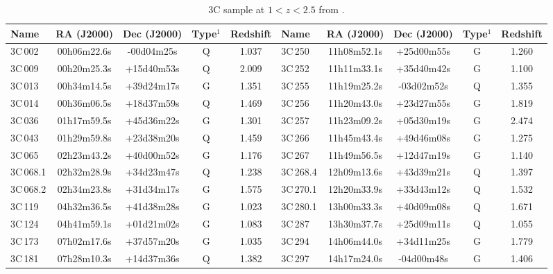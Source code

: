 \documentclass[mathleft,fleqn,%
]{an}
\begin{document}
\begin{table*}
\renewcommand{\thetable}{\arabic{table}}
\centering
\caption{3C sample at $1 < z < 2.5$ from \citet{Spinrad85}.
} 
\label{tab_sample}
\begin{tabular}{lcccc|lcccc}
\hline
\hline
Name & RA (J2000) & Dec (J2000)& Type$^1$ & Redshift          & Name & RA (J2000) & Dec (J2000)& Type$^1$ & Redshift \\
\hline
 3C\,002      & 00h06m22.6s  & -00d04m25s  &   Q  &   1.037   &   3C\,250      & 11h08m52.1s  & +25d00m55s  &   G  &   1.260  \\
 3C\,009      & 00h20m25.3s  & +15d40m53s  &   Q  &   2.009   &   3C\,252      & 11h11m33.1s  & +35d40m42s  &   G  &   1.100  \\
 3C\,013      & 00h34m14.5s  & +39d24m17s  &   G  &   1.351   &   3C\,255      & 11h19m25.2s  & -03d02m52s  &   Q  &   1.355  \\
 3C\,014      & 00h36m06.5s  & +18d37m59s  &   Q  &   1.469   &   3C\,256      & 11h20m43.0s  & +23d27m55s  &   G  &   1.819  \\
 3C\,036      & 01h17m59.5s  & +45d36m22s  &   G  &   1.301   &   3C\,257      & 11h23m09.2s  & +05d30m19s  &   G  &   2.474  \\
 3C\,043      & 01h29m59.8s  & +23d38m20s  &   Q  &   1.459   &   3C\,266      & 11h45m43.4s  & +49d46m08s  &   G  &   1.275  \\
 3C\,065      & 02h23m43.2s  & +40d00m52s  &   G  &   1.176   &   3C\,267      & 11h49m56.5s  & +12d47m19s  &   G  &   1.140  \\
 3C\,068.1    & 02h32m28.9s  & +34d23m47s  &   Q  &   1.238   &   3C\,268.4    & 12h09m13.6s  & +43d39m21s  &   Q  &   1.397  \\
 3C\,068.2    & 02h34m23.8s  & +31d34m17s  &   G  &   1.575   &   3C\,270.1    & 12h20m33.9s  & +33d43m12s  &   Q  &   1.532  \\
 3C\,119      & 04h32m36.5s  & +41d38m28s  &   G  &   1.023   &   3C\,280.1    & 13h00m33.3s  & +40d09m08s  &   Q  &   1.671  \\
 3C\,124      & 04h41m59.1s  & +01d21m02s  &   G  &   1.083   &   3C\,287      & 13h30m37.7s  & +25d09m11s  &   Q  &   1.055  \\
 3C\,173      & 07h02m17.6s  & +37d57m20s  &   G  &   1.035   &   3C\,294      & 14h06m44.0s  & +34d11m25s  &   G  &   1.779  \\
 3C\,181      & 07h28m10.3s  & +14d37m36s  &   Q  &   1.382   &   3C\,297      & 14h17m24.0s  & -04d00m48s  &   G  &   1.406  \\

\end{tabular}
\end{table*}
\end{document}
